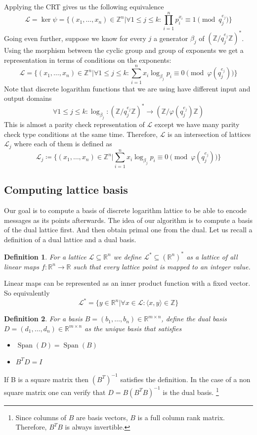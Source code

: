 \documentclass[12pt]{article}
\newcommand{\ZZ}{\mathbb{Z}}
\newcommand{\LL}{\mathcal{L}}
\DeclareMathOperator{\Span}{Span}
\newtheorem{definition}{Definition}
\begin{document}
Applying the CRT gives us the following equivalence
\[
    \LL = \ker \psi = \{(x_{1}, \dots, x_{n}) \in \ZZ^{n} |  \forall 1 \leq j \leq k: \prod_{i=1}^{n}p_{i}^{x_{i}} \equiv 1 \pmod{q_{j}^{e_{j}}}\}
\]
Going even further, suppose we know for every $j$ a generator ${\beta_{j}}$ of  $(\ZZ/q_{j}^{e_{j}}\ZZ)^*$. Using the morphism between the cyclic group and group of exponents we get a representation in terms of conditions on the exponents:
\[
    \LL = \{(x_{1}, \dots, x_{n}) \in \ZZ^{n} |  \forall 1 \leq j \leq k: \sum_{i=1}^{n}x_{i}\log_{\beta_{j}}p_{i}\equiv 0 \pmod{\varphi(q_{j}^{e_{j}})}\}
\]
Note that discrete logarithm functions that we are using have different input and output domains
\[
    \forall 1 \leq j \leq k: \log_{\beta_{j}}: (\ZZ/q_{j}^{e_{j}}\ZZ)^* \rightarrow (\ZZ/\varphi(q_{j}^{e_{j}})\ZZ)
\]
This is almost a parity check representation of $\LL$ except we have many parity check type conditions at the same time. Therefore, $\LL$ is an intersection of lattices $\LL_{j}$ where each of them is defined as
\[
\label{parity check}
    \LL_{j} \coloneqq \{(x_{1}, \dots, x_{n}) \in \ZZ^{n} | \sum_{i=1}^{n}x_{i}\log_{\beta_{j}}p_{i}\equiv 0 \pmod{\varphi(q_{j}^{e_{j}})}\}
\]


\subsection{Computing lattice basis}
\label{subsec:compute_basis_integers}


Our goal is to compute a basis of discrete logarithm lattice to be able to encode messages as its points afterwards. The idea of our algorithm is to compute a basis of the dual lattice first. And then obtain primal one from the dual.
Let us recall a definition of a dual lattice and a dual basis.
\begin{definition}
    For a lattice $\LL \subseteq \mathbb{R}^{n}$ we define $\LL^{*} \subseteq (\mathbb{R}^{n})^{*}$ as a lattice of all linear maps $f:\mathbb{R}^{n} \rightarrow \mathbb{R}$ such that every lattice point is mapped to an integer value.
\end{definition}
Linear maps can be represented as an inner product function with a fixed vector. So equivalently
\[
    \LL^{*} = \{y \in \mathbb{R}^{n} | \forall x \in \LL:  \langle x,y\rangle \in \ZZ \}
\]

\begin{definition}
    For a basis $B = (b_{1}, \dots, b_{n}) \in \mathbb{R}^{m \times n}$, define the dual basis $D = (d_{1}, \dots, d_{n}) \in \mathbb{R}^{m \times n}$ as the unique basis that satisfies
    \begin{itemize}
        \item $\Span(D) = \Span(B)$
        \item $B^{T}D = I$
    \end{itemize}
\end{definition}
If B is a square matrix then $(B^{T})^{-1}$ satisfies the definition. In the case of a non square matrix one can verify that $D = B(B^{T}B)^{-1}$ is the dual basis. \footnote{Since columns of $B$ are basis vectors, $B$ is a full column rank matrix. Therefore, $B^{T}B$ is always invertible.}
\end{document}
